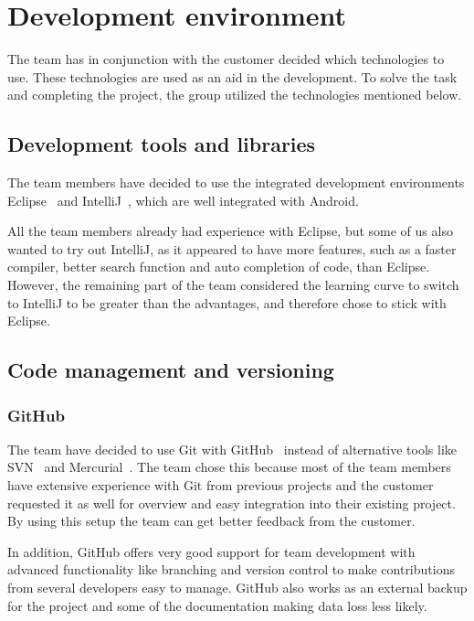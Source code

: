 \chapter{Development environment}

The team has in conjunction with the customer decided which technologies to use. These technologies are used as an aid in the development. To solve the task and completing the project, the group utilized the technologies mentioned below.

\section{Development tools and libraries}

The team members have decided to use the integrated development environments Eclipse~\cite{eclipse} and IntelliJ~\cite{intellij}, which are well integrated with Android. 

All the team members already had experience with Eclipse, but some of us also wanted to try out IntelliJ, as it appeared to have more features, such as a faster compiler, better search function and auto completion of code, than Eclipse. However, the remaining part of the team considered the learning curve to switch to IntelliJ to be greater than the advantages, and therefore chose to stick with Eclipse.

\section{Code management and versioning}
\subsection{GitHub}
The team have decided to use Git with GitHub~\cite{github} instead of alternative tools like SVN~\cite{svn} and Mercurial~\cite{mercurial}. 
The team chose this because most of the team members have extensive experience with Git from previous projects 
and the customer requested it as well for overview and easy integration into their existing project. By using 
this setup the team can get better feedback from the customer. 

In addition, GitHub offers very good support for team development 
with advanced functionality like branching and version control to make contributions from several developers easy 
to manage. GitHub also works as an external backup for the project and some of the documentation making data loss less likely.

